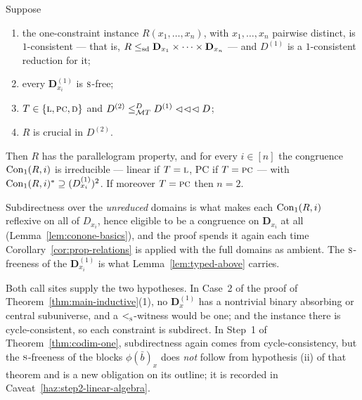 \begin{longlemma}\label{lem:parallelogram-crucial}
Suppose
\begin{enumerate}\romanlabels\tightlist
\item the one-constraint instance $R(x_{1},\dots,x_{n})$, with
  $x_{1},\dots,x_{n}$ pairwise distinct, is $1$-consistent --- that is,
  $R\sdle\mathbf D_{x_{1}}\times\dots\times\mathbf D_{x_{n}}$ --- and
  $D^{(1)}$ is a $1$-consistent reduction for it;
\item every $\mathbf D^{(1)}_{x_{i}}$ is $\TS$-free;
\item $T\in\{\TL,\TPC,\TD\}$ and $D^{(2)}\subte[D]{\MT T}D^{(1)}\lll D$;
\item $R$ is crucial in $D^{(2)}$.
\end{enumerate}
Then $R$ has the parallelogram property, and for every $i\in[n]$ the congruence
$\ConOne(R,i)$ is irreducible --- linear if $T=\TL$, PC if $T=\TPC$ --- with
$\cover{\ConOne(R,i)}\supseteq(D^{(1)}_{x_{i}})^{2}$. If moreover $T=\TPC$ then
$n=2$.
\end{longlemma}

\begin{hazard}\label{haz:parallelogram-hyp}
Subdirectness over the \emph{unreduced} domains is what makes each
$\ConOne(R,i)$ reflexive on all of $D_{x_{i}}$, hence eligible to be a
congruence on $\mathbf D_{x_{i}}$ at all (Lemma~\ref{lem:conone-basics}), and
the proof spends it again each time Corollary~\ref{cor:prop-relations} is
applied with the full domains as ambient. The $\TS$-freeness of the
$\mathbf D^{(1)}_{x_{i}}$ is what Lemma~\ref{lem:typed-above} carries.

Both call sites supply the two hypotheses. In Case~2 of the proof of
Theorem~\ref{thm:main-inductive}(1), no $\mathbf D^{(1)}_{x}$ has a nontrivial
binary absorbing or central subuniverse, and a $\subt{\TS}$-witness would be
one; and the instance there is cycle-consistent, so each constraint is
subdirect. In Step~1 of Theorem~\ref{thm:codim-one}, subdirectness again comes
from cycle-consistency, but the $\TS$-freeness of the blocks
$\phi(\bar b)_{x}$ does \emph{not} follow from hypothesis (ii) of that theorem
and is a new obligation on its outline; it is recorded in
Caveat~\ref{haz:step2-linear-algebra}.
\end{hazard}

